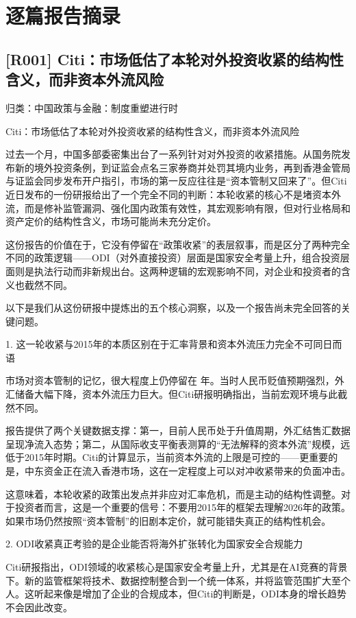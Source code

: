 \documentclass[11pt]{ctexart}
\begin{document}
\section{逐篇报告摘录}
\subsection{[R001] Citi：市场低估了本轮对外投资收紧的结构性含义，而非资本外流风险}
{\small\color{refgray}归类：中国政策与金融：制度重塑进行时}

Citi：市场低估了本轮对外投资收紧的结构性含义，而非资本外流风险

过去一个月，中国多部委密集出台了一系列针对对外投资的收紧措施。从国务院发布新的境外投资条例，到证监会点名三家券商并处罚其境内业务，再到香港金管局与证监会同步发布开户指引，市场的第一反应往往是“资本管制又回来了”。但Citi近日发布的一份研报给出了一个完全不同的判断：本轮收紧的核心不是堵资本外流，而是修补监管漏洞、强化国内政策有效性，其宏观影响有限，但对行业格局和资产定价的结构性含义，市场可能尚未充分定价。

这份报告的价值在于，它没有停留在“政策收紧”的表层叙事，而是区分了两种完全不同的政策逻辑——ODI（对外直接投资）层面是国家安全考量上升，组合投资层面则是执法行动而非新规出台。这两种逻辑的宏观影响不同，对企业和投资者的含义也截然不同。

以下是我们从这份研报中提炼出的五个核心洞察，以及一个报告尚未完全回答的关键问题。

1. 这一轮收紧与2015年的本质区别在于汇率背景和资本外流压力完全不可同日而语

市场对资本管制的记忆，很大程度上仍停留在 年。当时人民币贬值预期强烈，外汇储备大幅下降，资本外流压力巨大。但Citi研报明确指出，当前宏观环境与此截然不同。

报告提供了两个关键数据支撑：第一，目前人民币处于升值周期，外汇结售汇数据呈现净流入态势；第二，从国际收支平衡表测算的“无法解释的资本外流”规模，远低于2015年时期。Citi的计算显示，当前资本外流的上限是可控的——更重要的是，中东资金正在流入香港市场，这在一定程度上可以对冲收紧带来的负面冲击。

这意味着，本轮收紧的政策出发点并非应对汇率危机，而是主动的结构性调整。对于投资者而言，这是一个重要的信号：不要用2015年的框架去理解2026年的政策。如果市场仍然按照“资本管制”的旧剧本定价，就可能错失真正的结构性机会。

2. ODI收紧真正考验的是企业能否将海外扩张转化为国家安全合规能力

Citi研报指出，ODI领域的收紧核心是国家安全考量上升，尤其是在AI竞赛的背景下。新的监管框架将技术、数据控制整合到一个统一体系，并将监管范围扩大至个人。这听起来像是增加了企业的合规成本，但Citi的判断是，ODI本身的增长趋势不会因此改变。
\end{document}
